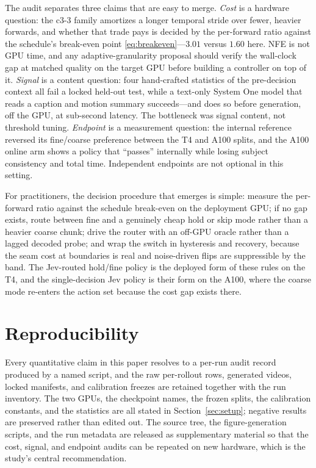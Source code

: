 \documentclass[journal]{IEEEtran}
\newcommand{\ccoarse}{\textup{c3-3}}
\begin{document}
The audit separates three claims that are easy to merge. \emph{Cost} is a hardware question: the \ccoarse{} family amortizes a longer temporal stride over fewer, heavier forwards, and whether that trade pays is decided by the per-forward ratio against the schedule's break-even point \eqref{eq:breakeven}---$3.01$ versus $1.60$ here. NFE is not GPU time, and any adaptive-granularity proposal should verify the wall-clock gap at matched quality on the target GPU before building a controller on top of it. \emph{Signal} is a content question: four hand-crafted statistics of the pre-decision context all fail a locked held-out test, while a text-only System One model that reads a caption and motion summary succeeds---and does so before generation, off the GPU, at sub-second latency. The bottleneck was signal content, not threshold tuning. \emph{Endpoint} is a measurement question: the internal reference reversed its fine/coarse preference between the T4 and A100 splits, and the A100 online arm shows a policy that ``passes'' internally while losing subject consistency and total time. Independent endpoints are not optional in this setting.

For practitioners, the decision procedure that emerges is simple: measure the per-forward ratio against the schedule break-even on the deployment GPU; if no gap exists, route between fine and a genuinely cheap hold or skip mode rather than a heavier coarse chunk; drive the router with an off-GPU oracle rather than a lagged decoded probe; and wrap the switch in hysteresis and recovery, because the seam cost at boundaries is real and noise-driven flips are suppressible by the band. The Jev-routed hold/fine policy is the deployed form of these rules on the T4, and the single-decision Jev policy is their form on the A100, where the coarse mode re-enters the action set because the cost gap exists there.

\section{Reproducibility}
\label{sec:repro}

Every quantitative claim in this paper resolves to a per-run audit record produced by a named script, and the raw per-rollout rows, generated videos, locked manifests, and calibration freezes are retained together with the run inventory. The two GPUs, the checkpoint names, the frozen splits, the calibration constants, and the statistics are all stated in Section~\ref{sec:setup}; negative results are preserved rather than edited out. The source tree, the figure-generation scripts, and the run metadata are released as supplementary material so that the cost, signal, and endpoint audits can be repeated on new hardware, which is the study's central recommendation.
\end{document}
